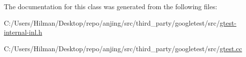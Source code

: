 The documentation for this class was generated from the following files\+:\begin{DoxyCompactItemize}
\item 
C\+:/\+Users/\+Hilman/\+Desktop/repo/anjing/src/third\+\_\+party/googletest/src/\hyperlink{gtest-internal-inl_8h}{gtest-\/internal-\/inl.\+h}\item 
C\+:/\+Users/\+Hilman/\+Desktop/repo/anjing/src/third\+\_\+party/googletest/src/\hyperlink{gtest_8cc}{gtest.\+cc}\end{DoxyCompactItemize}
